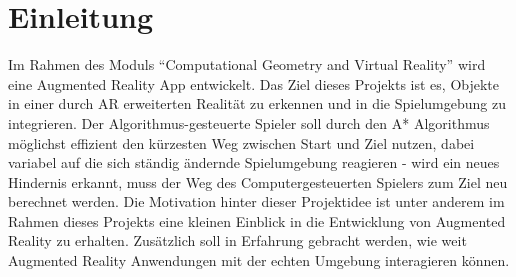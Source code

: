\chapter{Einleitung}

Im Rahmen des Moduls “Computational Geometry and Virtual Reality” wird eine Augmented Reality App entwickelt. Das Ziel dieses Projekts ist es, Objekte in einer durch AR erweiterten Realit\"at zu erkennen und in die Spielumgebung zu integrieren. Der Algorithmus-gesteuerte Spieler soll durch den A* Algorithmus m\"oglichst effizient den k\"urzesten Weg zwischen Start und Ziel nutzen, dabei variabel auf die sich st\"andig \"andernde Spielumgebung reagieren - wird ein neues Hindernis erkannt, muss der Weg des Computergesteuerten Spielers zum Ziel neu berechnet werden. 
Die Motivation hinter dieser Projektidee ist unter anderem im Rahmen dieses Projekts eine kleinen Einblick in die Entwicklung von Augmented Reality zu erhalten. Zusätzlich soll in Erfahrung gebracht werden, wie weit Augmented Reality Anwendungen mit der echten Umgebung interagieren können.
